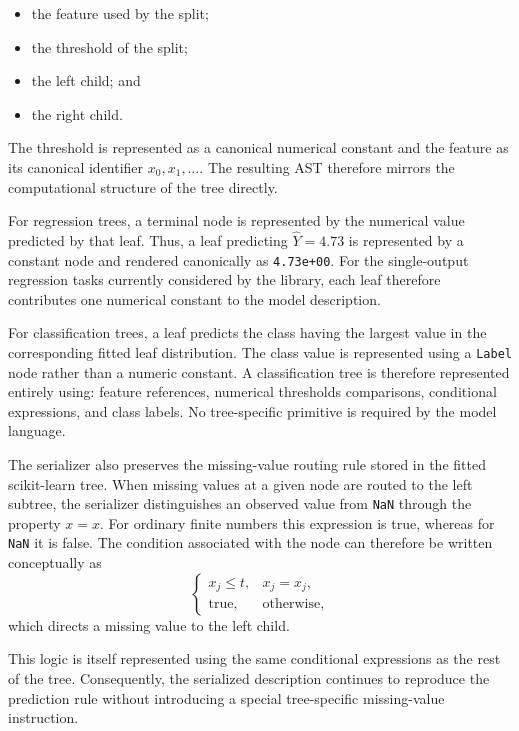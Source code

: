 \begin{itemize}
    \item the feature used by the split;
    \item the threshold of the split;
    \item the left child; and
    \item the right child.
\end{itemize}

The threshold is represented as a canonical numerical constant and the feature as its canonical identifier $x_0,x_1,\ldots$. The resulting AST therefore mirrors the computational structure of the tree directly.

For regression trees, a terminal node is represented by the numerical value predicted by that leaf. Thus, a leaf predicting $\widehat{Y}=4.73$ is represented by a constant node and rendered canonically as \texttt{4.73e+00}. For the single-output regression tasks currently considered by the library, each leaf therefore contributes one numerical constant to the model description.

For classification trees, a leaf predicts the class having the largest value in the corresponding fitted leaf distribution. The class value is represented using a \texttt{Label} node rather than a numeric constant. A classification tree is therefore represented entirely using: feature references, numerical thresholds comparisons, conditional expressions, and class labels. No tree-specific primitive is required by the model language.

The serializer also preserves the missing-value routing rule stored in the fitted scikit-learn tree. When missing values at a given node are routed to the left subtree, the serializer distinguishes an observed value from \texttt{NaN} through the property $x=x$. For ordinary finite numbers this expression is true, whereas for
\texttt{NaN} it is false. The condition associated with the node can therefore be written conceptually as
\[
\begin{cases}
x_j\leq t, & x_j=x_j, \\
\text{true}, & \text{otherwise},
\end{cases}
\]
which directs a missing value to the left child.

This logic is itself represented using the same conditional expressions as the rest of the tree. Consequently, the serialized description continues to reproduce the prediction rule without introducing a special tree-specific missing-value instruction.

